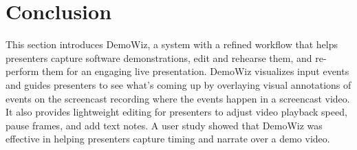 \section{Conclusion}

This section introduces DemoWiz, a system with a refined workflow that helps presenters capture software demonstrations, edit and rehearse them, and re-perform them for an engaging live presentation. DemoWiz visualizes input events and guides presenters to see what's coming up by overlaying visual annotations of events on the screencast recording where the events happen in a screencast video. It also provides lightweight editing for presenters to adjust video playback speed, pause frames, and add text notes. A user study showed that DemoWiz was effective in helping presenters capture timing and narrate over a demo video.

